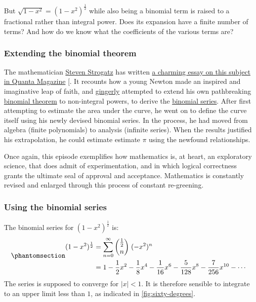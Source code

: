 \documentclass[
  a4paper,
]{article}
\begin{document}
But \(\sqrt{1 - x^2} = (1 - x^2)^{\frac{1}{2}}\) while also being a
binomial term is raised to a fractional rather than integral power. Does
its expansion have a finite number of terms? And how do we know what the
coefficients of the various terms are?

\subsubsection{Extending the binomial
theorem}\label{extending-the-binomial-theorem}

The mathematician
\href{https://en.wikipedia.org/wiki/Steven_Strogatz}{Steven Strogatz}
has written
\href{https://www.quantamagazine.org/how-isaac-newton-discovered-the-binomial-power-series-20220831/}{a
charming essay on this subject in Quanta Magazine}
{[}\citeproc{ref-strogatz-newton-2022}{26}{]}. It recounts how a young
Newton made an inspired and imaginative leap of faith, and
\href{https://www.merriam-webster.com/dictionary/gingerly}{gingerly}
attempted to extend his own pathbreaking
\href{https://en.wikipedia.org/wiki/Binomial_theorem}{binomial theorem}
to non-integral powers, to derive the
\href{https://en.wikipedia.org/wiki/Binomial_series}{binomial series}.
After first attempting to estimate the area under the curve, he went on
to define the curve itself using his newly devised binomial series. In
the process, he had moved from algebra (finite polynomials) to analysis
(infinite series). When the results justified his extrapolation, he
could estimate estimate \(\pi\) using the newfound relationships.

Once again, this episode exemplifies how mathematics is, at heart, an
exploratory science, that does admit of experimentation, and in which
logical correctness grants the ultimate seal of approval and acceptance.
Mathematics is constantly revised and enlarged through this process of
constant re-greening.

\subsubsection{Using the binomial
series}\label{using-the-binomial-series}

The binomial series for \((1 - x^2)^{\frac{1}{2}}\) is:
\begin{equation}\phantomsection\label{eq:approx}{
\begin{aligned}
(1 - x^2)^{\frac{1}{2}} &= \sum^{\infty}_{n=0}\binom{\frac{1}{2}}{n}\;(-x^2)^n\\
&= 1 - \frac{1}{2}x^2 - \frac{1}{8}x^4 - \frac{1}{16}x^6 - \frac{5}{128}x^8 - \frac{7}{256}x^{10} - \cdots
\end{aligned}
}\end{equation} The series is supposed to converge for
\(\lvert{x}\rvert < 1\). It is therefore sensible to integrate to an
upper limit less than \(1\), as indicated in \cref{fig:sixty-degrees}.
\end{document}

